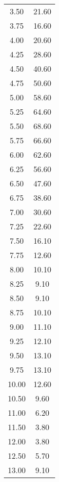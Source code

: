 \begin{longtable}{S[table-format=3.2] S[table-format=3.2]}
                        3.50 & 21.60\\
                        3.75 & 16.60\\
                        4.00 & 20.60\\
                        4.25 & 28.60\\
                        4.50 & 40.60\\
                        4.75 & 50.60\\
                        5.00 & 58.60\\
                        5.25 & 64.60\\
                        5.50 & 68.60\\
                        5.75 & 66.60\\
                        6.00 & 62.60\\
                        6.25 & 56.60\\
                        6.50 & 47.60\\
                        6.75 & 38.60\\
                        7.00 & 30.60\\
                        7.25 & 22.60\\
                        7.50 & 16.10\\
                        7.75 & 12.60\\
                        8.00 & 10.10\\
                        8.25 & 9.10\\
                        8.50 & 9.10\\
                        8.75 & 10.10\\
                        9.00 & 11.10\\
                        9.25 & 12.10\\
                        9.50 & 13.10\\
                        9.75 & 13.10\\
                        10.00 & 12.60\\
                        10.50 & 9.60\\
                        11.00 & 6.20\\
                        11.50 & 3.80\\
                        12.00 & 3.80\\
                        12.50 & 5.70\\
                        13.00 & 9.10\\
                \bottomrule
\end{longtable}
